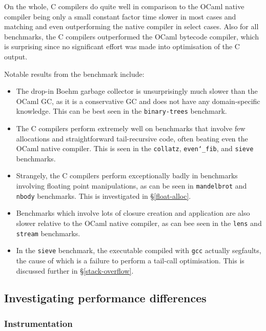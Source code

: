 On the whole, C compilers do quite well in comparison to the OCaml native
compiler being only a small constant factor time slower in most cases and
matching and even outperforming the native compiler in select cases. Also for
all benchmarks, the C compilers outperformed the OCaml bytecode compiler, which
is surprising since no significant effort was made into optimisation of the C
output.

Notable results from the benchmark include:

\begin{itemize}

\item The drop-in Boehm garbage collector is unsurprisingly much slower than the
    OCaml GC, as it is a conservative GC and does not have any domain-specific
    knowledge. This can be best seen in the \texttt{binary-trees} benchmark.

\item The C compilers perform extremely well on benchmarks that involve few
    allocations and straightforward tail-recursive code, often beating even the
    OCaml native compiler. This is seen in the \texttt{collatz},
    \texttt{even\char`_fib}, and \texttt{sieve} benchmarks.

\item Strangely, the C compilers perform exceptionally badly in benchmarks
    involving floating point manipulations, as can be seen in
    \texttt{mandelbrot} and \texttt{nbody} benchmarks. This is investigated in
    \S\ref{float-alloc}.

\item Benchmarks which involve lots of closure creation and application are also
    slower relative to the OCaml native compiler, as can bee seen in the
    \texttt{lens} and \texttt{stream} benchmarks.

\item In the \texttt{sieve} benchmark, the executable compiled with \texttt{gcc}
    actually segfaults, the cause of which is a failure to perform a tail-call
    optimisation. This is discussed further in \S\ref{stack-overflow}.

\end{itemize}

\subsection{Investigating performance differences}

\subsubsection{Instrumentation}

